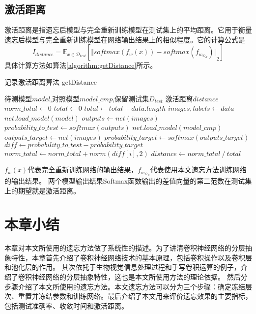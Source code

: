 \subsection{激活距离}
激活距离是指遗忘后模型与完全重新训练模型在测试集上的平均距离。它用于衡量遗忘后模型与完全重新训练模型在网络输出结果上的相似程度。它的计算公式是
\begin{equation}
I_{distance} = {\mathbb{E}}_{x\in {\mathcal{D}_{test}}}[{\Vert softmax(f_w(x)) - softmax(f_{w_{\mathcal{D}_R}}) \Vert}_2 ] \label{index_distance}
\end{equation}
具体计算方法如算法\ref{algorithm:getDistance}所示。
\begin{algorithm}
	\renewcommand{\algorithmicrequire}{\textbf{Input:}}
	\renewcommand{\algorithmicensure}{\textbf{Output:}}
	\caption{记录激活距离算法  getDistance}
	\label{algorithm:getDistance}
	\begin{algorithmic}[1]
        \REQUIRE 待测模型$model$,对照模型$model\_cmp$,保留测试集$D_{test}$
        \ENSURE  激活距离$distance$
        \STATE $norm\_total \gets 0$
        \STATE $total \gets 0$
            \STATE $total \gets total + data.length$
            \STATE $images, labels \gets data$
            \STATE $net.load\_model(model)$
            \STATE $outputs \gets net(images)$
            \STATE $probability\_to\_test \gets softmax(outputs)$
            \STATE $net.load\_model(model\_cmp)$
            \STATE $outputs\_target \gets net(images)$
            \STATE $probability\_target \gets softmax(outputs\_target)$
            \STATE $diff \gets probability\_to\_test - probability\_target $
                \STATE $norm\_total \gets norm\_total + norm(diff[i],2)$
            \ENDFOR
        \ENDFOR
        \STATE $distance \gets norm\_total {\ } / {\ } total$
	\end{algorithmic}  
\end{algorithm}

$f_w(x)$代表完全重新训练网络的输出结果，$f_{w_{\mathcal{D}_R}}$代表使用本文遗忘方法训练网络的输出结果。
两个模型输出结果Softmax函数输出的差值向量的第二范数在测试集上的期望就是激活距离。


\section{本章小结}
本章对本文所使用的遗忘方法做了系统性的描述。为了讲清卷积神经网络的分层抽象特性，本章首先介绍了卷积神经网络技术的基本原理，包括卷积操作以及卷积层和池化层的作用。
其次依托于生物视觉信息处理过程和手写卷积运算的例子，介绍了卷积神经网络的分层抽象特性，这也是本文所使用方法的理论依据。
然后分步骤介绍了本文所使用的遗忘方法。本文遗忘方法可以分为三个步骤：确定冻结层次、重置并冻结参数和训练网络。最后介绍了本文用来评价遗忘效果的主要指标，包括测试准确率、收敛时间和激活距离。
